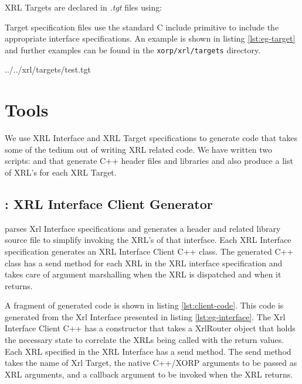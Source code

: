 \documentclass[11pt]{article}
\begin{document}
XRL Targets are declared in \textit{.tgt} files using:

\smallskip
\noindent{}

\smallskip Target specification files use the standard C include
primitive to include the appropriate interface specifications.  An
example is shown in listing \ref{lst:eg-target} and further examples
can be found in the \texttt{xorp/xrl/targets} directory.

%
{../../xrl/targets/test.tgt}

\section{Tools}

We use XRL Interface and XRL Target specifications to generate code
that takes some of the tedium out of writing XRL related code.  We
have written two scripts: \clntgen and \tgtgen that
generate C++ header files and libraries and also produce a list of
XRL's for each XRL Target.

\subsection{\clntgen : XRL Interface Client Generator}

\clntgen parses Xrl Interface specifications and generates a header
and related library source file to simplify invoking the XRL's of that
interface.  Each XRL Interface specification generates an XRL
Interface Client C++ class.  The generated C++ class has a send method
for each XRL in the XRL interface specification and takes care of
argument marshalling when the XRL is dispatched and when it returns.

A fragment of generated code is shown in listing \ref{lst:client-code}.
This code is generated from the Xrl Interface presented in listing
\ref{lst:eg-interface}.  The Xrl Interface Client C++ has a constructor
that takes a XrlRouter object that holds the necessary state to
correlate the XRLs being called with the return values.  Each XRL
specified in the XRL Interface has a send method.  The send method
takes the name of Xrl Target, the native C++/XORP arguments to be
passed as XRL arguments, and a callback argument to be invoked when
the XRL returns.
\end{document}
